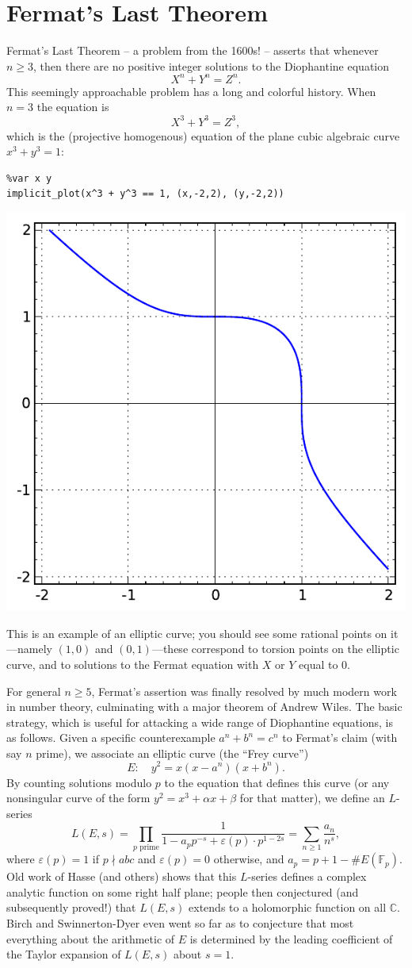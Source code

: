 \documentclass{book}
\theoremstyle{plain}
\theoremstyle{definition}
\numberwithin{equation}{section}
\numberwithin{figure}{section}
\numberwithin{table}{section}
\newcommand{\C}{\mathbb{C}}
\newcommand{\F}{\mathbb{F}}
\begin{document}
\section{Fermat's Last Theorem}\label{sec:fltintro}
Fermat's Last Theorem -- a problem from the 1600s! -- asserts
that whenever $n\geq 3$, then there are no positive integer
solutions to the Diophantine equation
$$
X^n + Y^n = Z^n.
$$
This seemingly approachable problem has a long and colorful
history.
When $n=3$ the equation is
$$
X^3 + Y^3 = Z^3,
$$
which is the (projective homogenous) equation of the plane cubic algebraic
curve $x^3 + y^3 = 1$:
\begin{lstlisting}
%var x y
implicit_plot(x^3 + y^3 == 1, (x,-2,2), (y,-2,2))
\end{lstlisting}
\begin{center}
\includegraphics[width=.5\textwidth]{pics/flt3.pdf}
\end{center}
This is an example of an elliptic curve; you should
see some rational points on it---namely $(1,0)$ and $(0,1)$---these
correspond to torsion points on the elliptic curve, and to solutions
to the Fermat equation with $X$ or $Y$ equal to $0$.

For general $n\geq 5$, Fermat's assertion was finally resolved by much modern
work in number theory, culminating with a major theorem of
Andrew Wiles.  The basic strategy, which is useful for
attacking a wide range of Diophantine equations, is as follows.
Given a specific counterexample
$a^n + b^n = c^n$ to Fermat's claim (with say $n$ prime), we associate
an elliptic curve (the ``Frey curve'')
$$
  E: \quad y^2 = x(x-a^n)(x+b^n).
$$
By counting solutions modulo $p$ to the equation that defines this curve (or
any nonsingular curve of the form $y^2=x^3+\alpha x + \beta$ for that matter),
we define an $L$-series
$$
L(E,s) =
\prod_{p \text{ prime}} \frac{1}{1-a_p p^{-s} + \varepsilon(p)\cdot p^{1-2s}}
 = \sum_{n\geq 1} \frac{a_n}{n^s},
$$
where $\varepsilon(p)=1$ if $p\nmid abc$ and $\varepsilon(p)=0$ otherwise,
and $a_p = p+1-\#E(\F_p)$.
Old work of Hasse (and others)
shows that this $L$-series defines a complex analytic
function on some right half plane; people then conjectured (and
subsequently proved!)
that $L(E,s)$ extends to a holomorphic function on all $\C$.
Birch and Swinnerton-Dyer even went so far as to conjecture
that most everything about the arithmetic of $E$
is determined by the leading coefficient of the
Taylor expansion of $L(E,s)$ about $s=1$.
\end{document}
